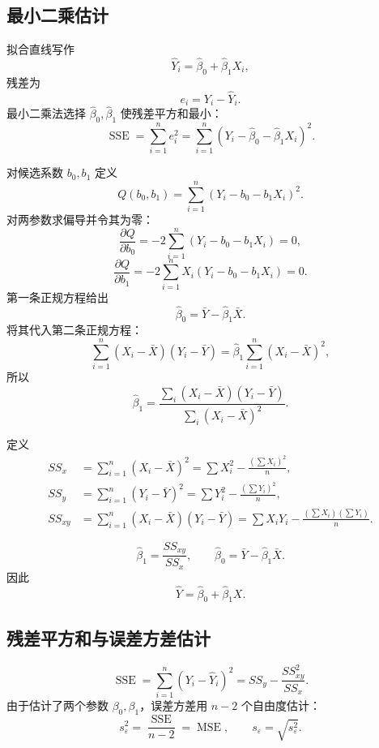 \documentclass[11pt,a4paper]{article}
\theoremstyle{definition}
\theoremstyle{plain}
\theoremstyle{remark}
\begin{document}
\subsection{最小二乘估计}

拟合直线写作
\[
    \hat Y_i=\hat\beta_0+\hat\beta_1X_i,
\]
残差为
\[
    e_i=Y_i-\hat Y_i.
\]
最小二乘法选择 $\hat\beta_0,\hat\beta_1$ 使残差平方和最小：
\[
    \operatorname{SSE}
    =
    \sum_{i=1}^n e_i^2
    =
    \sum_{i=1}^n
    (Y_i-\hat\beta_0-\hat\beta_1X_i)^2.
\]

对候选系数 $b_0,b_1$ 定义
\[
    Q(b_0,b_1)=\sum_{i=1}^n(Y_i-b_0-b_1X_i)^2.
\]
对两参数求偏导并令其为零：
\[
    \frac{\partial Q}{\partial b_0}
    =
    -2\sum_{i=1}^n(Y_i-b_0-b_1X_i)=0,
\]
\[
    \frac{\partial Q}{\partial b_1}
    =
    -2\sum_{i=1}^nX_i(Y_i-b_0-b_1X_i)=0.
\]
第一条正规方程给出
\[
    \hat\beta_0=\bar Y-\hat\beta_1\bar X.
\]
将其代入第二条正规方程：
\[
    \sum_{i=1}^n(X_i-\bar X)(Y_i-\bar Y)
    =
    \hat\beta_1\sum_{i=1}^n(X_i-\bar X)^2,
\]
所以
\[
    \hat\beta_1
    =
    \frac{\sum_i(X_i-\bar X)(Y_i-\bar Y)}
    {\sum_i(X_i-\bar X)^2}.
\]

定义
\begin{align}
    SS_x &= \sum_{i=1}^n (X_i-\bar X)^2
          =\sum X_i^2-\frac{(\sum X_i)^2}{n},\\
    SS_y &= \sum_{i=1}^n (Y_i-\bar Y)^2
          =\sum Y_i^2-\frac{(\sum Y_i)^2}{n},\\
    SS_{xy} &= \sum_{i=1}^n (X_i-\bar X)(Y_i-\bar Y)
          =\sum X_iY_i-\frac{(\sum X_i)(\sum Y_i)}{n}.
\end{align}

\begin{memorybox}
\[
    \boxed{\hat\beta_1=\frac{SS_{xy}}{SS_x}},
    \qquad
    \boxed{\hat\beta_0=\bar Y-\hat\beta_1\bar X}.
\]
因此
\[
    \boxed{\hat Y=\hat\beta_0+\hat\beta_1X.}
\]
\end{memorybox}

\subsection{残差平方和与误差方差估计}

\begin{memorybox}
\[
    \operatorname{SSE}
    =
    \sum_{i=1}^n(Y_i-\hat Y_i)^2
    =
    SS_y-\frac{SS_{xy}^2}{SS_x}.
\]
由于估计了两个参数 $\beta_0,\beta_1$，误差方差用 $n-2$ 个自由度估计：
\[
    s_\varepsilon^2=\frac{\operatorname{SSE}}{n-2}
    =\operatorname{MSE},
    \qquad
    s_\varepsilon=\sqrt{s_\varepsilon^2}.
\]
\end{memorybox}
\end{document}
